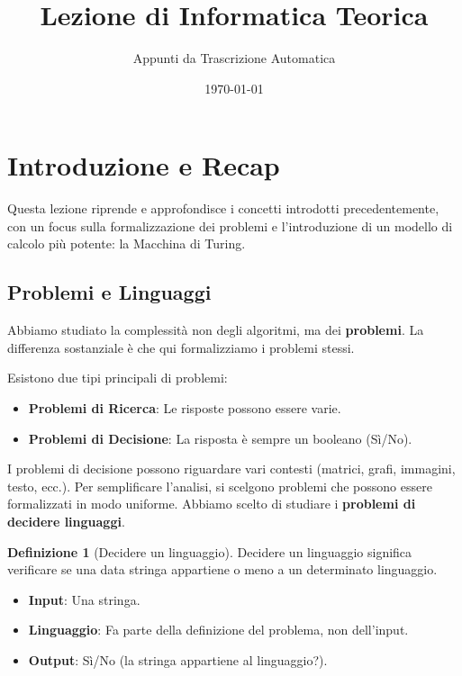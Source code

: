 \documentclass[a4paper]{article}
\title{Lezione di Informatica Teorica}
\author{Appunti da Trascrizione Automatica}
\date{\today}
\theoremstyle{definition} %
\newtheorem{definition}{Definizione}
\begin{document}
\maketitle
\tableofcontents
\newpage

\section{Introduzione e Recap}

Questa lezione riprende e approfondisce i concetti introdotti precedentemente, con un focus sulla formalizzazione dei problemi e l'introduzione di un modello di calcolo più potente: la Macchina di Turing.

\subsection{Problemi e Linguaggi}
Abbiamo studiato la complessità non degli algoritmi, ma dei \textbf{problemi}. La differenza sostanziale è che qui formalizziamo i problemi stessi.

Esistono due tipi principali di problemi:
\begin{itemize}
    \item \textbf{Problemi di Ricerca}: Le risposte possono essere varie.
    \item \textbf{Problemi di Decisione}: La risposta è sempre un booleano (Sì/No).
\end{itemize}

I problemi di decisione possono riguardare vari contesti (matrici, grafi, immagini, testo, ecc.). Per semplificare l'analisi, si scelgono problemi che possono essere formalizzati in modo uniforme. Abbiamo scelto di studiare i \textbf{problemi di decidere linguaggi}.

\begin{definition}[Decidere un linguaggio]
    Decidere un linguaggio significa verificare se una data stringa appartiene o meno a un determinato linguaggio.
    \begin{itemize}
        \item \textbf{Input}: Una stringa.
        \item \textbf{Linguaggio}: Fa parte della definizione del problema, non dell'input.
        \item \textbf{Output}: Sì/No (la stringa appartiene al linguaggio?).
    \end{itemize}
\end{definition}
\end{document}
